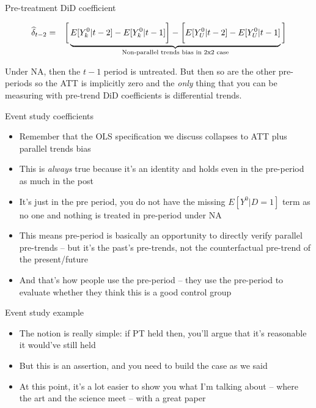 \documentclass{beamer}
\begin{document}
\begin{frame}{Pre-treatment DiD coefficient}

\begin{eqnarray*}
\widehat{\delta}_{t-2} &=& \bigg [  \underbrace{\textcolor{black}{E[Y^0_k | t-2]} - E[Y^0_k | t-1] \bigg ] - \bigg [ E[Y^0_U | t-2] - E[Y_U^0 | t-1] }_{\mathclap{\text{Non-parallel trends bias in 2x2 case}}} \bigg ]
\end{eqnarray*}

\bigskip

Under NA, then the $t-1$ period is untreated.  But then so are the other pre-periods so the ATT is implicitly zero and the \emph{only} thing that you can be measuring with pre-trend DiD coefficients is differential trends.


\end{frame}



\begin{frame}{Event study coefficients}

\begin{itemize}
\item Remember that the OLS specification we discuss collapses to ATT plus parallel trends bias
\item This is \emph{always} true because it's an identity and holds even in the pre-period as much in the post
\item It's just in the pre period, you do not have the missing $E[Y^0|D=1]$ term as no one and nothing is treated in pre-period under NA
\item This means pre-period is basically an opportunity to directly verify parallel pre-trends -- but it's the past's pre-trends, not the counterfactual pre-trend of the present/future
\item And that's how people use the pre-period -- they use the pre-period to evaluate whether they think this is a good control group
\end{itemize}

\end{frame}

\begin{frame}{Event study example}

\begin{itemize}
\item The notion is really simple: if PT held then, you'll argue that it's reasonable it would've still held
\item But this is an assertion, and you need to build the case as we said
\item At this point, it's a lot easier to show you what I'm talking about -- where the art and the science meet -- with a great paper
\end{itemize}

\end{frame}
\end{document}
